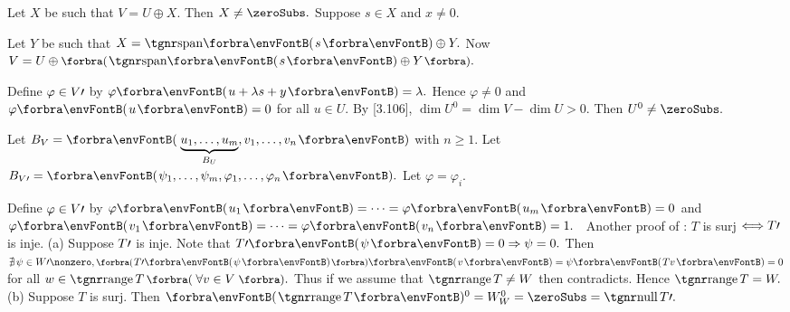 \par\quad
Let $X$ be such that $V=U\oplus X.$ Then $X\neq\zeroSubs.$ Suppose $s\in X$ and $x\neq 0.$\par\quad
Let $Y$ be such that $X=\Span{s}\oplus Y.$ Now $V=U\oplus\BigPar{\Span{s}\oplus Y}.$\par\quad
Define $\varphi\in V\prime$ by $\varphi\Par{u+\lambda s+y}=\lambda.$ Hence $\varphi\neq 0$ and $\varphi\Par{u}=0$ for all $u\in U.$\PfEnd\vspace{6pt}\quad
\Or {} \;By [3.106], $\dim U^0=\dim V-\dim U>0.$ Then $U^0\neq\zeroSubs.$\par\quad
\Blind{\Or }\Or Let $B_V=\Par{\underbrace{u_1, \dots,u_m}_{B_U}, v_1, \dots, v_n}$ with $n\geqslant 1$. Let $B_{V\apostrophe}=\Par{\psi_1,\dots,\psi_m,\varphi_1,\dots,\varphi_n}.$ Let $\varphi=\varphi_i$.\vspace{4pt}\par\quad
\Blind{\Or }\Blind{\Or }\Or Define $\varphi\in V\prime$ by $\varphi\Par{u_1}=\dots=\varphi\Par{u_m}=0$ and $\varphi\Par{v_1}=\dots=\varphi\Par{v_n}=1.$\PfEnd\vspace{8pt}
\Comment \,\,\,{\tgsc\large Another proof of \tgbfx[3.108]}: $T$ is surj $\Longleftrightarrow T\prime$ is inje.\parCom
(a) Suppose $T\prime$ is inje. Note that $T\apostrophe\Par{\psi}=0\Rightarrow \psi=0.$\parCom\Ha
Then $\nexists\,\psi\in W\apostrophe\nonzero,\BigPar{T\apostrophe\Par{\psi}}\Par{v}=\psi\Par{Tv}=0$ for all $w\in\range T\,\BigPar{\,\forall v\in V\,}.$\parCom\Ha
Thus if we assume that $\range T\neq W$ then contradicts. Hence $\range T=W.$\parCom
(b) Suppose $T$ is surj. Then $\Par{\range T}{^0}=W_W^0=\zeroSubs=\null T\apostrophe.$\PfEnd
\SepLine

\SepLine\pagebreak

